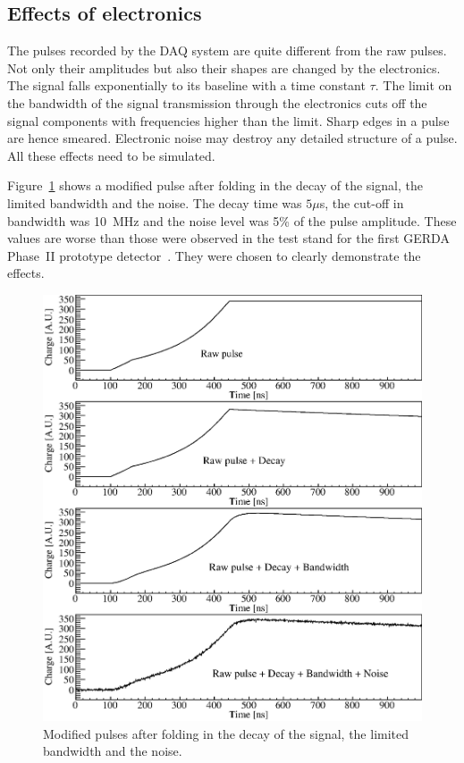 \documentclass[epj,referee]{svjour}
\begin{document}
\subsection{Effects of electronics} 
\label{s:dbn}
The pulses recorded by the DAQ system are quite different from the raw
pulses. Not only their amplitudes but also their shapes are changed by
the electronics. The signal falls exponentially to its baseline with a
time constant $\tau$. The limit on the bandwidth of the signal
transmission through the electronics cuts off the signal components
with frequencies higher than the limit. Sharp edges in a pulse are
hence smeared. Electronic noise may destroy any detailed structure of
a pulse. All these effects need to be simulated.
 
Figure~\ref{f:elec} shows a modified pulse after folding in the decay
of the signal, the limited bandwidth and the noise. The decay time was
$5 \mu$s, the cut-off in bandwidth was 10~MHz and the noise level was
5\% of the pulse amplitude. These values are worse than those were
observed in the test stand for the first GERDA Phase~II prototype
detector~\cite{si}. They were chosen to clearly demonstrate the
effects.
\begin{figure}[htpb]
\centering
\includegraphics[width=\linewidth]{PSDBN} 
\caption{Modified pulses after folding in the decay of the signal, the
limited bandwidth and the noise.}
\label{f:elec} 
\end{figure}
\end{document}
